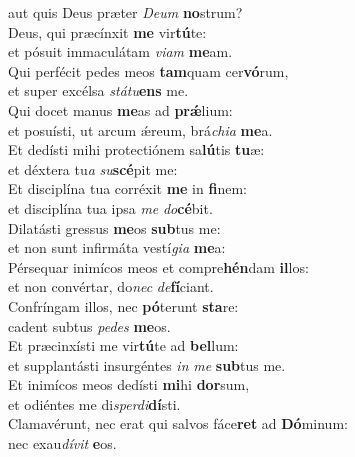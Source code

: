 \evenverse aut quis Deus præter \textit{De}\textit{um} \textbf{no}strum?\\
\oddverse Deus, qui præcínxit \textbf{me} vir\textbf{tú}te:~\*\\
\oddverse et pósuit immaculátam \textit{vi}\textit{am} \textbf{me}am.\\
\evenverse Qui perfécit pedes meos \textbf{tam}quam cer\textbf{vó}rum,~\*\\
\evenverse et super excélsa \textit{stá}\textit{tu}\textbf{ens} me.\\
\oddverse Qui docet manus \textbf{me}as ad \textbf{prǽ}lium:~\*\\
\oddverse et posuísti, ut arcum ǽreum, brá\textit{chi}\textit{a} \textbf{me}a.\\
\evenverse Et dedísti mihi protectiónem sa\textbf{lú}tis \textbf{tu}æ:~\*\\
\evenverse et déxtera tu\textit{a} \textit{su}\textbf{scé}pit me:\\
\oddverse Et disciplína tua corréxit \textbf{me} in \textbf{fi}nem:~\*\\
\oddverse et disciplína tua ipsa \textit{me} \textit{do}\textbf{cé}bit.\\
\evenverse Dilatásti gressus \textbf{me}os \textbf{sub}tus me:~\*\\
\evenverse et non sunt infirmáta vestí\textit{gi}\textit{a} \textbf{me}a:\\
\oddverse Pérsequar inimícos meos et compre\textbf{hén}dam \textbf{il}los:~\*\\
\oddverse et non convértar, do\textit{nec} \textit{de}\textbf{fí}ciant.\\
\evenverse Confríngam illos, nec \textbf{pó}terunt \textbf{sta}re:~\*\\
\evenverse cadent subtus \textit{pe}\textit{des} \textbf{me}os.\\
\oddverse Et præcinxísti me vir\textbf{tú}te ad \textbf{bel}lum:~\*\\
\oddverse et supplantásti insurgéntes \textit{in} \textit{me} \textbf{sub}tus me.\\
\evenverse Et inimícos meos dedísti \textbf{mi}hi \textbf{dor}sum,~\*\\
\evenverse et odiéntes me di\textit{sper}\textit{di}\textbf{dí}sti.\\
\oddverse Clamavérunt, nec erat qui salvos fáce\textbf{ret} ad \textbf{Dó}minum:~\*\\
\oddverse nec exau\textit{dí}\textit{vit} \textbf{e}os.\\
